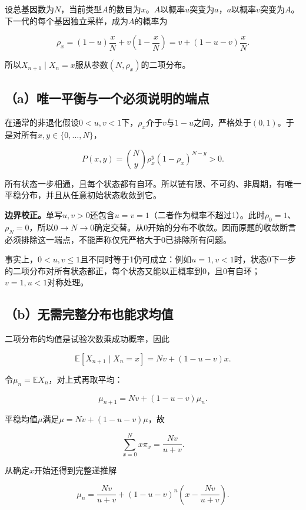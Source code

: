 \documentclass[
  11pt,a4paper,UTF8,fontset=fandol]{ctexart}
\begin{document}
设总基因数为\(N\)，当前类型\(A\)的数目为\(x\)。\(A\)以概率\(u\)突变为\(a\)，\(a\)以概率\(v\)突变为\(A\)。下一代的每个基因独立采样，成为\(A\)的概率为

\[\rho_x=(1-u)\frac{x}{N}+v\left(1-\frac{x}{N}\right)
=v+(1-u-v)\frac{x}{N}.\]

所以\(X_{n+1}\mid X_n=x\)服从参数\((N,\rho_x)\)的二项分布。

\subsection{（a）唯一平衡与一个必须说明的端点}\label{aux552fux4e00ux5e73ux8861ux4e0eux4e00ux4e2aux5fc5ux987bux8bf4ux660eux7684ux7aefux70b9}

在通常的非退化假设\(0<u,v<1\)下，\(\rho_x\)介于\(v\)与\(1-u\)之间，严格处于\((0,1)\)。于是对所有\(x,y\in\{0,\ldots,N\}\)，

\[P(x,y)=\binom Ny\rho_x^y(1-\rho_x)^{N-y}>0.\]

所有状态一步相通，且每个状态都有自环。所以链有限、不可约、非周期，有唯一平稳分布，并且从任意初始状态收敛到它。

\textbf{边界校正。}单写\(u,v>0\)还包含\(u=v=1\)（二者作为概率不超过1）。此时\(\rho_0=1\)、\(\rho_N=0\)，所以\(0\to N\to0\)确定交替。从0开始的分布不收敛。因而原题的收敛断言必须排除这一端点，不能声称仅凭严格大于0已排除所有问题。

事实上，\(0<u,v\le1\)且不同时等于1仍可成立：例如\(u=1,v<1\)时，状态0下一步的二项分布对所有状态都正，每个状态又能以正概率到0，且0有自环；\(v=1,u<1\)对称处理。

\subsection{（b）无需完整分布也能求均值}\label{bux65e0ux9700ux5b8cux6574ux5206ux5e03ux4e5fux80fdux6c42ux5747ux503c}

二项分布的均值是试验次数乘成功概率，因此

\[\mathbb E[X_{n+1}\mid X_n=x]=Nv+(1-u-v)x.\]

令\(\mu_n=\mathbb EX_n\)，对上式再取平均：

\[\mu_{n+1}=Nv+(1-u-v)\mu_n.\]

平稳均值\(\mu\)满足\(\mu=Nv+(1-u-v)\mu\)，故

\[\boxed{\sum_{x=0}^Nx\pi_x=\frac{Nv}{u+v}.}\]

从确定\(x\)开始还得到完整递推解

\[\boxed{\mu_n=\frac{Nv}{u+v}+(1-u-v)^n\left(x-\frac{Nv}{u+v}\right).}\]
\end{document}
